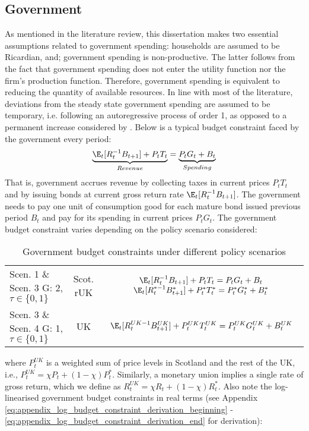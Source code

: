 \subsection{Government}

As mentioned in the literature review, this dissertation makes two essential assumptions related to government spending: households are assumed to be Ricardian, and; government spending is non-productive. The latter follows from the fact that government spending does not enter the utility function nor the firm's production function. Therefore, government spending is equivalent to reducing the quantity of available resources. In line with most of the literature, deviations from the steady state government spending are assumed to be temporary, i.e. following an autoregressive process of order 1, as opposed to a permanent increase considered by \textcite{baxter_1993_fiscal}. Below is a typical budget constraint faced by the government every period:
\begin{align}
 \underbrace{\E_t [R^{-1}_tB_{t+1}] + P_t T_t}_{Revenue} = \underbrace{P_tG_t + B_t}_{Spending}
\end{align}
That is, government accrues revenue by collecting taxes in current prices $P_t T_t$ and by issuing bonds at current gross return rate $\E_t [R^{-1}_tB_{t+1}]$. The government needs to pay one unit of consumption good for each mature bond issued previous period $B_t$ and pay for its spending in current prices $P_t G_t$. The government budget constraint varies depending on the policy scenario considered:
\begin{table}[H]
 \renewcommand{\arraystretch}{2}
 \centering
 \begin{tabular}{l|c|c}
 \makecell{Scen. 1 \& Scen. 3\\ G: 2, $\tau \in \{0, 1\}$} & \makecell{Scot. \\ rUK } & 
 \makecell{
 $\E_t [R^{-1}_tB_{t+1}] + P_t T_t = P_tG_t + B_t$\\
 $\E_t [{R^{*-1}_{t}}B^*_{t+1}] + P^*_tT^*_t = P^*_tG^*_t + B^*_t$
 } \\ 
 \makecell{Scen. 3 \& Scen. 4\\ G: 1, $\tau \in \{0, 1\}$} & UK & 
 $\E_t [{R^{UK-1}_{t}}B^{UK}_{t+1}] + P^{UK}_tT^{UK}_t = P^{UK}_tG^{UK}_t + B^{UK}_t$
 \end{tabular}
 \vspace{0.5cm}
 \caption{Government budget constraints under different policy scenarios}
\end{table}
where $P^{UK}_t$ is a weighted sum of price levels in Scotland and the rest of the UK, i.e., $P^{UK}_t = \chi P_t + (1-\chi)P^*_t$. Similarly, a monetary union implies a single rate of gross return, which we define as $R^{UK}_t = \chi R_t + (1-\chi)R^*_t$. Also note the log-linearised government budget constraints in real terms (see Appendix \ref{eq:appendix_log_budget_constraint_derivation_beginning} - \ref{eq:appendix_log_budget_constraint_derivation_end} for derivation):
